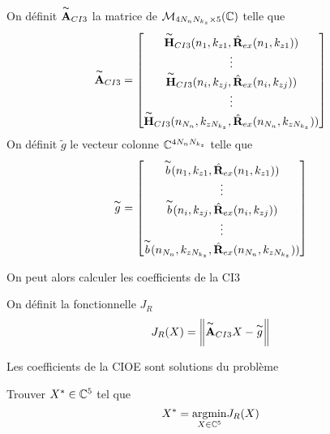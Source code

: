     \begin{defn}
      On définit \(\overset{\thicksim}{\mathbf{A}}_{CI3}\) la matrice de \(\mathcal{M}_{4N_{n}N_{k_z}\times5}(\mathbb C)\) telle que
      \begin{equation*}
        \overset{\thicksim}{\mathbf{A}}_{CI3} = 
        \begin{bmatrix}
          \overset{\thicksim}{\mathbf{H}}_{CI3}(n_1,k_{z1},\hat{\mathbf{R}}_{ex}(n_1,k_{z1}))
          \\
          \vdots
          \\
          \overset{\thicksim}{\mathbf{H}}_{CI3}(n_i,k_{zj},\hat{\mathbf{R}}_{ex}(n_i,k_{zj}))
          \\
          \vdots
          \\
          \overset{\thicksim}{\mathbf{H}}_{CI3}(n_{N_n},k_{zN_{k_z}},\hat{\mathbf{R}}_{ex}(n_{N_n},k_{zN_{k_z}}))
        \end{bmatrix}
      \end{equation*}
      On définit \(\tilde{g}\) le vecteur colonne \(\mathbb C^{4N_{n}N_{k_z}}\) telle que
      \begin{equation*}
        \overset{\thicksim}{g} = 
        \begin{bmatrix}
          \overset{\thicksim}{b}(n_1,k_{z1},\hat{\mathbf{R}}_{ex}(n_1,k_{z1}))
          \\
          \vdots
          \\
          \overset{\thicksim}{b}(n_i,k_{zj},\hat{\mathbf{R}}_{ex}(n_i,k_{zj}))
          \\
          \vdots
          \\
          \overset{\thicksim}{b}(n_{N_n},k_{zN_{k_z}},\hat{\mathbf{R}}_{ex}(n_{N_n},k_{zN_{k_z}}))
        \end{bmatrix}
      \end{equation*}
    \end{defn}

    On peut alors calculer les coefficients de la CI3

    \begin{defn}
      On définit la fonctionnelle \(J_R\)
      \begin{equation*}
        J_R(X) = \left\lVert\overset{\thicksim}{\mathbf{A}}_{CI3}X - \overset{\thicksim}{g}\right\rVert
      \end{equation*}
    \end{defn}

    \begin{thm}

      Les coefficients de la CIOE sont solutions du problème

      Trouver \(X^* \in \mathbb C^5\) tel que
      \begin{equation*}
        X^* = {\underset{X\in \mathbb C^5}{\operatorname{argmin}}} J_R(X)
      \end{equation*}
    \end{thm}

